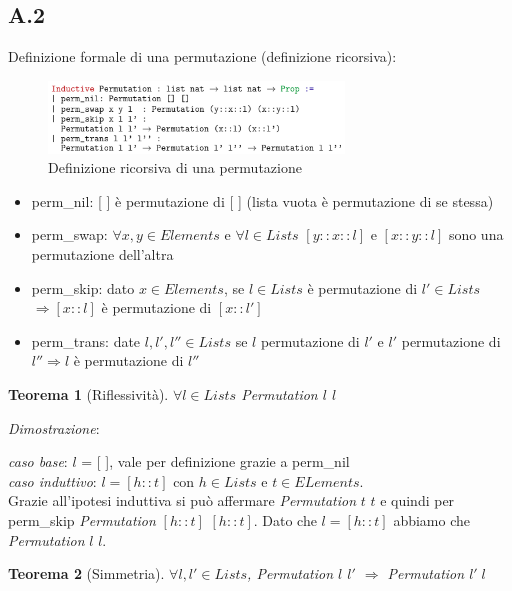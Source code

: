 \documentclass[a4paper]{article}
\newtheorem*{theorem}{Teorema}
\begin{document}
\subsection{A.2}
Definizione formale di una permutazione (definizione ricorsiva):
\begin{figure}[!ht]
\centering
\includegraphics[width=0.7\textwidth]{./img/permutazione_ricorsiva.png}
\caption{Definizione ricorsiva di una permutazione} \label{FIG:recursive_permutation1}
\end{figure}
\begin{itemize}
	\item perm\_nil: [ ] è permutazione di [ ] (lista vuota è permutazione di se stessa)
	\item perm\_swap: $\forall x,y \in Elements$ e $\forall l \in Lists$ $[y::x::l]$ e $[x::y::l]$ sono una permutazione dell'altra
	\item perm\_skip: dato $x \in Elements$, se $l \in Lists$ è permutazione di $l' \in Lists$ $\Rightarrow [x::l]$ è permutazione di $[x::l']$
	\item perm\_trans: date $l, l', l'' \in Lists$ se $l$ permutazione di $l'$ e $l'$ permutazione di $l'' \Rightarrow l$ è permutazione di $l''$ 
\end{itemize}
\begin{theorem}[Riflessività] $\forall l \in Lists$ Permutation $l$ $l$\end{theorem}
\textit{Dimostrazione}:
\begin{adjustwidth}{2cm}{}
	\textit{caso base}: $l$ = [ ], vale per definizione grazie a perm\_nil\\
	\textit{caso induttivo}: $l = [h::t]$ con $h \in Lists$ e $t \in ELements$.\\
	Grazie all'ipotesi induttiva si può affermare \textit{Permutation} $t$ $t$ e quindi per perm\_skip \textit{Permutation} $[h::t]$ $[h::t]$. Dato che $l = [h::t]$ abbiamo che \textit{Permutation} $l$ $l$.
\end{adjustwidth}
\begin{theorem}[Simmetria] $\forall l,l' \in Lists$, Permutation $l$ $l'$ $\Rightarrow $ Permutation $l' \; l$\end{theorem}
\end{document}
